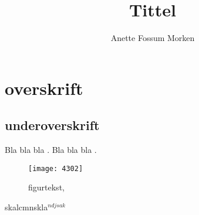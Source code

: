 \documentclass[12pt, a4paper]{article} %
\title{Tittel}
\author[1]{Anette Fossum Morken}
\date{}
\begin{document}
\begin{titlepage} %
\maketitle
\end{titlepage}

\newpage 
\renewcommand{\contentsname}{\centering Innholdfortegnelse} %
\tableofcontents

\newpage


\section{overskrift} %
\subsection{underoverskrift}

Bla bla bla \cite{referanse_bok}. Bla bla bla \cite{referanse_artikel}.
\begin{figure}[H]
\texttt{[image: 4302]}
\caption{figurtekst, \cite{referanse_internett}}
\end{figure}
skalcmnskla$^{ndjsak}$



%
%
\end{document}
